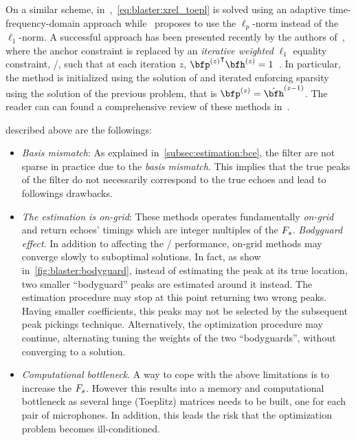 \mynewline
On a similar scheme, in~,~\cref{eq:blaster:xrel_toepl} is solved using an adaptive time-frequency-domain approach while~ proposes to use the $\ell_p$-norm instead of the $\ell_1$-norm.
A successful approach has been presented recently by the authors of~, where the anchor constraint is replaced by an \textit{iterative weighted} $\ell_1$ equality constraint, \ie/, such that at each iteration $z$, $\ktranspose{\bfp^{(z)}}\bfh^{(z)} = 1$~.
In particular, the method is initialized using the solution of  and iterated enforcing sparsity using the solution of the previous problem, that is $\bfp^{(z)} = \hat{\bfh}^{(z-1)}$.
The reader can can found a comprehensive review of these methods in~.

 described above are the followings:
\begin{itemize}
    \item \textit{Basis mismatch}:
    As explained in~\cref{subsec:estimation:bce}, the filter are not sparse in practice due to the \textit{basis mismatch}.
    This implies that the true peaks of the filter do not necessarily correspond to the true echoes and lead to followings drawbacks.
    \item \textit{The estimation is on-grid}:
    These methods operates fundamentally \textit{on-grid} and return echoes' timings which are integer multiples of the $F_s$.
    \textit{Bodyguard effect}.
    In addition to affecting the \AER/ performance, on-grid methods may converge slowly to suboptimal solutions.
    In fact, as show in~\cref{fig:blaster:bodyguard}, instead of estimating the peak at its true location, two smaller ``bodyguard'' peaks are estimated around it instead.
    The estimation procedure may stop at this point returning two wrong peaks.
    Having smaller coefficients, this peaks may not be selected by the subsequent peak pickings technique.
    Alternatively, the optimization procedure may continue, alternating tuning the weights of the two ``bodyguards'', without converging to a solution.
    \item \textit{Computational bottleneck}.
    A way to cope with the above limitations is to increase the $F_s$.
    However this results into a memory and computational bottleneck as several huge (Toeplitz) matrices needs to be built, one for each pair of microphones.
    In addition, this leads the risk that the optimization problem becomes ill-conditioned.
\end{itemize}

